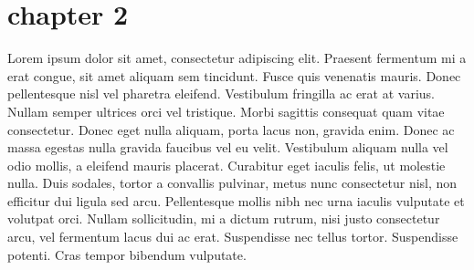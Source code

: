 \documentclass[a4paper, 12pt]{scrbook}
\begin{document}
\chapter{chapter 2}

Lorem ipsum dolor sit amet, consectetur adipiscing elit. Praesent fermentum mi a erat congue, sit amet aliquam sem tincidunt. Fusce quis venenatis mauris. Donec pellentesque nisl vel pharetra eleifend. Vestibulum fringilla ac erat at varius. Nullam semper ultrices orci vel tristique. Morbi sagittis consequat quam vitae consectetur. Donec eget nulla aliquam, porta lacus non, gravida enim. Donec ac massa egestas nulla gravida faucibus vel eu velit. Vestibulum aliquam nulla vel odio mollis, a eleifend mauris placerat. Curabitur eget iaculis felis, ut molestie nulla. Duis sodales, tortor a convallis pulvinar, metus nunc consectetur nisl, non efficitur dui ligula sed arcu. Pellentesque mollis nibh nec urna iaculis vulputate et volutpat orci. Nullam sollicitudin, mi a dictum rutrum, nisi justo consectetur arcu, vel fermentum lacus dui ac erat. Suspendisse nec tellus tortor. Suspendisse potenti. Cras tempor bibendum vulputate.
\end{document}
